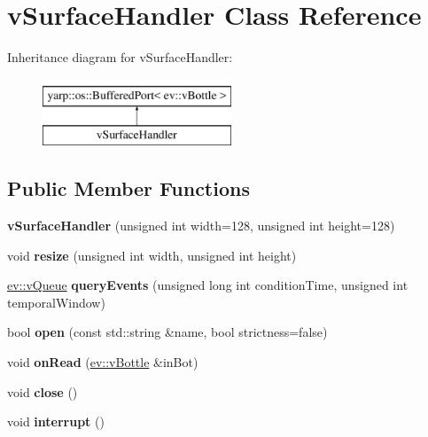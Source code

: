 \hypertarget{classvSurfaceHandler}{}\section{v\+Surface\+Handler Class Reference}
\label{classvSurfaceHandler}
Inheritance diagram for v\+Surface\+Handler\+:\begin{figure}[H]
\begin{center}
\leavevmode
\includegraphics[height=2.000000cm]{classvSurfaceHandler}
\end{center}
\end{figure}
\subsection*{Public Member Functions}
\begin{DoxyCompactItemize}
\item 
{\bfseries v\+Surface\+Handler} (unsigned int width=128, unsigned int height=128)\hypertarget{classvSurfaceHandler_a9f1381af78c147b148fa1df4c7d4aebc}{}\label{classvSurfaceHandler_a9f1381af78c147b148fa1df4c7d4aebc}

\item 
void {\bfseries resize} (unsigned int width, unsigned int height)\hypertarget{classvSurfaceHandler_a391db0c36a4af25b7a33cb60c1f7a73b}{}\label{classvSurfaceHandler_a391db0c36a4af25b7a33cb60c1f7a73b}

\item 
\hyperlink{classev_1_1vQueue}{ev\+::v\+Queue} {\bfseries query\+Events} (unsigned long int condition\+Time, unsigned int temporal\+Window)\hypertarget{classvSurfaceHandler_a02ce8ea7ed25907c6c83cfd277748f7d}{}\label{classvSurfaceHandler_a02ce8ea7ed25907c6c83cfd277748f7d}

\item 
bool {\bfseries open} (const std\+::string \&name, bool strictness=false)\hypertarget{classvSurfaceHandler_ac8ec7581a0704b7dee1ad1265bf0fb9d}{}\label{classvSurfaceHandler_ac8ec7581a0704b7dee1ad1265bf0fb9d}

\item 
void {\bfseries on\+Read} (\hyperlink{classev_1_1vBottle}{ev\+::v\+Bottle} \&in\+Bot)\hypertarget{classvSurfaceHandler_a336eced82529cafe4bfc6e304d4aa074}{}\label{classvSurfaceHandler_a336eced82529cafe4bfc6e304d4aa074}

\item 
void {\bfseries close} ()\hypertarget{classvSurfaceHandler_adba8a4ac6f797f379ec06ef929857c81}{}\label{classvSurfaceHandler_adba8a4ac6f797f379ec06ef929857c81}

\item 
void {\bfseries interrupt} ()\hypertarget{classvSurfaceHandler_a1a6902fe50bd86981743a2af909d6073}{}\label{classvSurfaceHandler_a1a6902fe50bd86981743a2af909d6073}

\end{DoxyCompactItemize}


